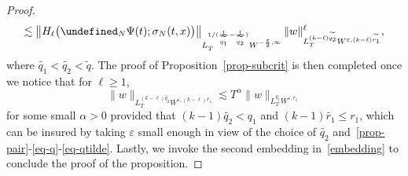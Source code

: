 \documentclass[10pt]{amsart}
\theoremstyle{definition}\newtheorem{defi}[theo]{Definition}\newtheorem{rema}[theo]{Remark}\newtheorem{exam}[theo]{Example}\newtheorem{exem}[theo]{Example}\newtheorem{nota}[theo]{Notation}
\let\P= \undefined
\newcommand{\P}{\mathbf{P}}
\newcommand{\al}{\alpha}
\newcommand{\eps}{\varepsilon}
\newcommand{\s}{\sigma}
\newcommand{\les}{\lesssim}
\begin{document}
\begin{proof}
\begin{multline*}
\les \left\|H_{\ell}\big(\P_N\Psi(t);\s_N(t,x)\big)\right\|_{L^{1/(\frac1{\widetilde{q_1}}-\frac1{\widetilde{q_2}})}_TW^{-\frac\eps2,\infty}} \|w\|_{L^{(k-\ell) \widetilde{q_2}}_TW^{\eps,(k-\ell) \widetilde{r_1}}}^{\ell},
\end{multline*}
where $\widetilde{q_1}<\widetilde{q_2}<\widetilde{q}$. The proof of Proposition~\ref{prop-subcrit} is then completed once we notice that for $\ell\ge 1$,
\begin{equation*}
\|w\|_{L^{(k-\ell) \widetilde{q_2}}_TW^{\eps,(k-\ell) \widetilde{r_1}}} \les T^\al\|w\|_{L^{q_1}_TW^{\eps,r_1}}
\end{equation*}
for some small $\al >0$ provided that $(k-1)\widetilde{q_2}<q_1$ and $(k-1)\widetilde{r_1}\leq r_1$, which can be insured by taking $\eps$ small enough in view of the choice of $\widetilde{q_2}$ and~\eqref{prop-pair}-\eqref{eq-q}-\eqref{eq-qtilde}. Lastly, we invoke the second embedding in~\eqref{embedding} to conclude the proof of the proposition.
\end{proof}
\end{document}
